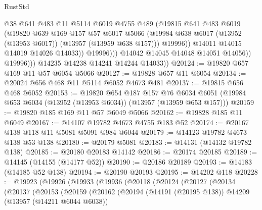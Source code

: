 \begin{lexlean}{RustStd}
\begin{coremodule}
                            @38
                            @641
                            @483
                            @11
                            @5114
                            @6019
                            @4755
                            @489
                            (@19815
                              @641
                              @483
                              @6019
                              (@19820
                                @639
                                @169
                                @157
                                @57
                                @6017
                                @5066
                                (@19984
                                  @638
                                  @6017
                                  (@13952 (@13953 @6017))
                                  (@13957 (@13959 @638 @157)))
                                @19996))
                            @14011
                            @14015
                            @14019
                            @14026
                            @14033))
                        @19996)))
                  @14042
                  @14045
                  @14048
                  @14051
                  @14056))
              @19996)))
        @14235
        @14238
        @14241
        @14244
        @14033))
@20124 := @19820 @657 @169 @11 @57 @6054 @5066
@20127 := @19828 @657 @11 @6054
@20134 := @20024 @656 @468 @11 @5114 @6052 @4673 @481
@20137 := @19815 @656 @468 @6052
@20153 := @19820
    @654
    @187
    @157
    @76
    @6034
    @6051
    (@19984 @653 @6034 (@13952 (@13953 @6034)) (@13957 (@13959 @653 @157)))
@20159 := @19820 @185 @169 @11 @57 @6049 @5066
@20162 := @19828 @185 @11 @6049
@20167 := @14107 @19782 @4673 @4755 @183 @52
@20174 := @20167 @138 @118 @11 @5081 @5091 @984 @6044
@20179 := @14123 @19782 @4673 @138 @53 @138
@20180 := @20179 @5081
@20183 := @14131 (@14132 @19782 @138)
@20185 := @20180 @20183 @14142
@20186 := @20174 @20185
@20189 := @14145 (@14155 (@14177 @52))
@20190 := @20186 @20189
@20193 := @14183 (@14185 @52 @138)
@20194 := @20190 @20193
@20195 := @14202 @118
@20228 := @19923
    (@19926
      (@19933
        (@19936
          (@20118
            (@20124
              (@20127
                (@20134
                  (@20137
                    (@20153
                      (@20159
                        (@20162
                          (@20194
                            (@14191 (@20195 @138))
                            @14209
                            (@13957 (@14211 @6044 @6038))

\end{coremodule}
\end{lexlean}
